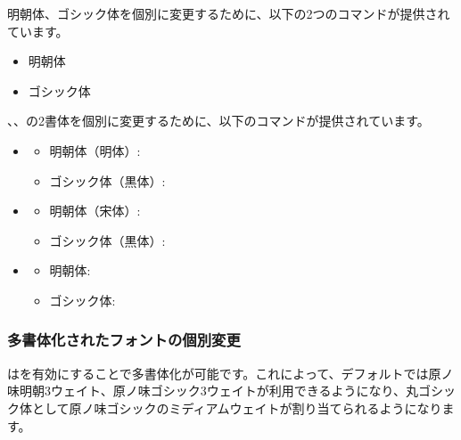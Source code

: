 \documentclass[../supplement]{subfiles}
\begin{document}
明朝体、ゴシック体を個別に変更するために、以下の2つのコマンドが提供されています。

\begin{itemize}
  \item 明朝体     
  \item ゴシック体 
\end{itemize}

{\fantizi}、{\jiantizi}、{\hankgo}の2書体を個別に変更するために、以下のコマンドが提供されています。

\begin{itemize}
  \item {\fantizi}
  \begin{itemize}
    \item 明朝体{\footnotesize（明体）}:      
    \item ゴシック体{\footnotesize（黒体）}:  
  \end{itemize}
  \item {\jiantizi}
  \begin{itemize}
    \item 明朝体{\footnotesize（宋体）}:      
    \item ゴシック体{\footnotesize（黒体）}:  
  \end{itemize}
  \item {\hankgo}
  \begin{itemize}
    \item 明朝体:      
    \item ゴシック体:  
  \end{itemize}
\end{itemize}


\subsubsection{多書体化されたフォントの個別変更}

はを有効にすることで多書体化が可能です。これによって、デフォルトでは原ノ味明朝3ウェイト、原ノ味ゴシック3ウェイトが利用できるようになり、丸ゴシック体として原ノ味ゴシックのミディアムウェイトが割り当てられるようになります。
\end{document}
